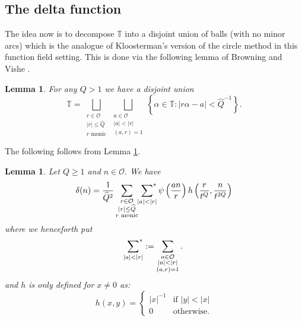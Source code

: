 \documentclass[10pt]{amsart}
\theoremstyle{plain}
\theoremstyle{plain}
\newtheorem{lemma}[theorem]{Lemma}
\theoremstyle{remark}
\theoremstyle{definition}
\renewcommand{\hat}{\widehat}
\newcommand{\hQ}{\widehat{Q}}
\newcommand{\TT}{\mathbb{T}}
\newcommand{\sumstar}{\sideset{}{^*}\sum}
\newcommand{\cO}{\mathcal{O}}
\begin{document}
\subsection{The delta function}The idea now is to decompose $\TT$ into a disjoint union of balls (with no minor arcs) which is the analogue of Kloosterman's version of the circle method in this function field setting. This is done via the following lemma of Browning and Vishe \cite[Lemma~4.2]{Browning}.
\begin{lemma}\label{lem:dissection}
For any $Q>1$ we have a disjoint union 
\[
\TT=\bigsqcup_{\substack{r\in \cO\\ |r|\leq \hat Q\\
\text{$r$ monic}}}
\bigsqcup_{\substack{a\in \cO\\ |a|<|r|\\ (a,r)=1} }
\left\{\alpha\in \TT: |r\alpha-a|<\hat Q^{-1}\right\}.\]
\end{lemma}
The following follows from Lemma \ref{lem:dissection}.
\begin{lemma}\label{delta} Let $Q\geq  1$ and $n\in \cO.$ 
We have 
\begin{equation}\label{deltaeq}
\delta(n)= \frac{1}{\hQ^{2}}
\sum_{\substack{
r\in \cO\\
|r|\leq \hat Q\\
\text{$r$ monic}
} }
\sumstar_{\substack{
|a|<|r|} }
\psi\left(\frac{an}{r}\right) h\left(\frac{r}{t^Q},\frac{n}{t^{2Q}}\right)
\end{equation}
where we henceforth put
\[
\sumstar_{\substack{
|a|<|r| }}
:=\sum_{\substack{
a\in \cO\\ 
|a|<|r|\\ (a,r)=1} }.
\]
and $h$ is only  defined for $x\neq 0$ as:
\[h(x,y)=\begin{cases}|x|^{-1} & \mbox{if $|y|<|x|$}\\ 0 & \mbox{otherwise.}\end{cases}\]
%
\end{lemma}
\end{document}
